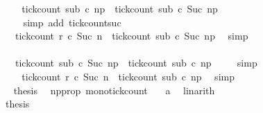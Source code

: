 \begin{isabellebody}
\isanewline
\ \ \ \ \ \ \ \ \ \ \ \ \ \ \isamarkupfalse%
\ \isamarkupfalse%
\ {\isacartoucheopen}tick{\isacharunderscore}count\ sub\ c\ n\isactrlsub p\ {\isasymle}\ tick{\isacharunderscore}count\ sub\ c\ {\isacharparenleft}Suc\ n\isactrlsub p{\isacharparenright}{\isacartoucheclose}\isanewline
\ \ \ \ \ \ \ \ \ \ \ \ \ \ \ \ \isamarkupfalse%
\ {\isacharparenleft}simp\ add{\isacharcolon}\ tick{\isacharunderscore}count{\isacharunderscore}suc{\isacharparenright}\isanewline
\ \ \ \ \ \ \ \ \ \ \ \ \ \ \isamarkupfalse%
\ \isamarkupfalse%
\isanewline
\ \ \ \ \ \ \ \ \ \ \ \ \ \ \ \ {\isacartoucheopen}tick{\isacharunderscore}count\ r\ c\ {\isacharparenleft}Suc\ n{\isacharparenright}\ {\isasymle}\ tick{\isacharunderscore}count\ sub\ c\ {\isacharparenleft}Suc\ n\isactrlsub p{\isacharparenright}{\isacartoucheclose}\ \isamarkupfalse%
\ simp\isanewline
\ \ \ \ \ \ \ \ \ \ \ \ \ \ \isamarkupfalse%
\ \isamarkupfalse%
\isanewline
\ \ \ \ \ \ \ \ \ \ \ \ \ \ \ \ {\isacartoucheopen}tick{\isacharunderscore}count\ sub\ c\ {\isacharparenleft}Suc\ n\isactrlsub p{\isacharparenright}\ {\isasymle}\ tick{\isacharunderscore}count\ sub\ c\ n\isactrlsub p{\isacartoucheclose}\ \isamarkupfalse%
\ {}\ \isamarkupfalse%
\ simp\isanewline
\ \ \ \ \ \ \ \ \ \ \ \ \ \ \isamarkupfalse%
\ \isamarkupfalse%
\ {\isacartoucheopen}tick{\isacharunderscore}count\ r\ c\ {\isacharparenleft}Suc\ n{\isacharparenright}\ {\isasymle}\ tick{\isacharunderscore}count\ sub\ c\ n\isactrlsub p{\isacartoucheclose}\ \isamarkupfalse%
\ simp\isanewline
\ \ \ \ \ \ \ \ \ \ \ \ \ \ \isamarkupfalse%
\ {\isacharquery}thesis\ \isamarkupfalse%
\ np{\isacharunderscore}prop\ mono{\isacharunderscore}tick{\isacharunderscore}count\ \ \isamarkupfalse%
\ a\ \isamarkupfalse%
\ linarith\isanewline
\ \ \ \ \ \ \ \ \ \ \isamarkupfalse%
\isanewline
\ \ \ \ \ \ \isamarkupfalse%
\isanewline
\ \ \ \ \isacommand{{\isacharbraceright}}\isamarkupfalse%
\ \isamarkupfalse%
\ {\isacharquery}thesis\ \isacommand{{\isachardot}{\isachardot}}\isamarkupfalse%
\isanewline
\ \ \isamarkupfalse%

\end{isabellebody}
